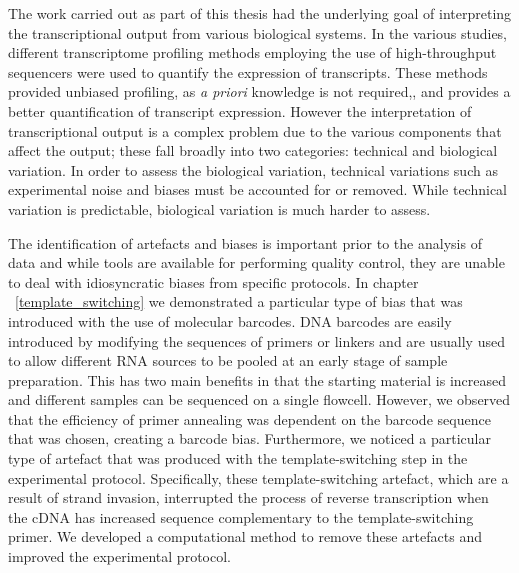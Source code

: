 The work carried out as part of this thesis had the underlying goal of interpreting the transcriptional output from various biological systems. In the various studies, different transcriptome profiling methods employing the use of high-throughput sequencers were used to quantify the expression of transcripts. These methods provided unbiased profiling, as \textit{a priori} knowledge is not required,, and provides a better quantification of transcript expression. However the interpretation of transcriptional output is a complex problem due to the various components that affect the output; these fall broadly into two categories: technical and biological variation. In order to assess the biological variation, technical variations such as experimental noise and biases must be accounted for or removed. While technical variation is predictable, biological variation is much harder to assess\cite{pmid22769017}.

The identification of artefacts and biases is important prior to the analysis of data and while tools\cite{pmid19737799, fastqc} are available for performing quality control, they are unable to deal with idiosyncratic biases from specific protocols. In chapter ~\ref{template_switching} we demonstrated a particular type of bias that was introduced with the use of molecular barcodes. DNA barcodes are easily introduced by modifying the sequences of primers or linkers and are usually used to allow different RNA sources to be pooled at an early stage of sample preparation. This has two main benefits in that the starting material is increased and different samples can be sequenced on a single flowcell. However, we observed that the efficiency of primer annealing was dependent on the barcode sequence that was chosen\cite{Tang01022013}, creating a barcode bias. Furthermore, we noticed a particular type of artefact that was produced with the template-switching step in the experimental protocol\cite{Tang01022013}. Specifically, these template-switching artefact, which are a result of strand invasion, interrupted the process of reverse transcription when the cDNA has increased sequence complementary to the template-switching primer. We developed a computational method to remove these artefacts and improved the experimental protocol.

